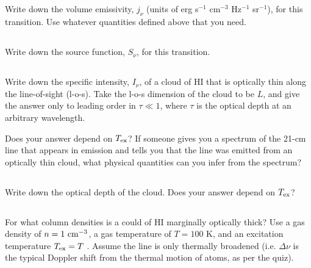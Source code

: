 \documentclass[11pt]{article}
\begin{document}
\subsection{}
\vspace{-8pt}
Write down the volume emissivity, $j_\nu$ (units of erg s$^{-1}$ cm$^{-3}$ Hz$^{-1}$ sr$^{-1}$), for
this transition. Use whatever quantities defined above that you need.

\subsection{}
\vspace{-8pt}
Write down the source function, $S_\nu$, for this transition.

\subsection{}
\vspace{-8pt}
Write down the specific intensity, $I_\nu$, of a cloud of HI that is optically
thin along the line-of-sight (l-o-s). Take the l-o-s dimension of the cloud to
be $L$, and give the answer only to leading order in $\tau\ll1$, where $\tau$ is the
optical depth at an arbitrary wavelength.

Does your answer depend on ${T_{\rm ex}}$?  If someone gives you a spectrum of the 21-cm
line that appears in emission and tells you that the line was emitted from an
optically thin cloud, what physical quantities can you infer from the spectrum?

\subsection{}
\vspace{-8pt}
Write down the optical depth of the cloud. Does your answer depend on ${T_{\rm ex}}$?

\subsection{} %
\vspace{-8pt}
For what column densities is a could of HI marginally optically
thick? Use a gas density of $n=1~{\rm cm}^{-3}$, a gas temperature of $T = 100$ K, and an
excitation temperature ${T_{\rm ex}} = T$ . Assume the line is only thermally broadened (i.e.
$\Delta\nu$ is the typical Doppler shift from the thermal motion of atoms, as per the quiz).
\end{document}
